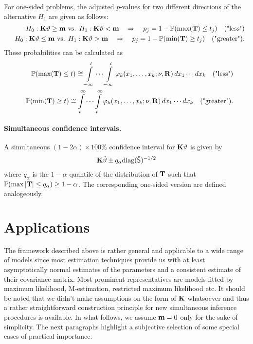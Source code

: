 \documentclass[12pt]{article}
\begin{document}
For one-sided problems, the adjusted $p$-values for two different
directions of the alternative $H_1$ are given as follows:
\begin{eqnarray*}
& & H_0: \mathbf{K} \vartheta \ge \mathbf{m} \text{ vs. } H_1: \mathbf{K} \vartheta < \mathbf{m}  \quad \Rightarrow \quad p_j  =  1 - \mathbb{P}(\max(\mathbf{T}) \le
t_j) \quad \text{("less")} \\
& & H_0: \mathbf{K} \vartheta \le \mathbf{m} \text{ vs. } H_1: \mathbf{K} \vartheta > \mathbf{m} \quad \Rightarrow \quad p_j  =  1 - \mathbb{P}(\min(\mathbf{T}) \ge
t_j) \quad \text{("greater")}.
\end{eqnarray*}
These probabilities can be calculated as 
\begin{eqnarray*}
& & \mathbb{P}(\max(\mathbf{T}) \le t)  \cong\int\limits_{-\infty}^t \cdots \int\limits_{-\infty}^t 
\varphi_k(x_1, \dots, x_k; \nu, \mathbf{R}) \, dx_1 \cdots dx_k \quad \text{("less")}\\
& & \mathbb{P}(\min(\mathbf{T}) \ge t) \cong  \int\limits_{t}^\infty \cdots \int\limits_{t}^\infty \varphi_k(x_1, \dots, x_k;
\nu, \mathbf{R}) \, dx_1 \cdots dx_k \quad
\text{("greater")}.
\end{eqnarray*}


\paragraph{Simultaneous confidence intervals.}

A simultaneous $(1 - 2\alpha) \times 100\%$ 
confidence interval for $\mathbf{K} \vartheta$ is given by
\begin{eqnarray*} 
\mathbf{K} \hat{\vartheta} \pm q_\alpha \text{diag}(\hat{\textsf{S}})^{-1/2}
\end{eqnarray*}
where $q_\alpha$ is the $1 - \alpha$ 
quantile of the distribution of $\mathbf{T}$ 
such that $\mathbb{P}(\max{|\mathbf{T}|} \le q_\alpha) \ge 1 - \alpha$. The corresponding
one-sided version are defined analogeously.

\section{Applications} \label{applications}

The framework described above is rather general and applicable 
to a wide range of models since most estimation techniques provide us with 
at least asymptotically normal estimates of the parameters 
and a consistent estimate of their covariance matrix. Most prominent
representatives are models fitted by maximum likelihood, M-estimation,
restricted maximum likelihood etc. 
It should be noted that we didn't make assumptions on the form
of $\mathbf{K}$ whatsoever and thus a rather straightforward construction 
principle for new simultaneous inference procedures is available. In
what follows, we assume $\mathbf{m} = 0$ only for the sake of simplicity.
The next paragraphs highlight a subjective selection of 
some special cases of practical importance.
\end{document}
